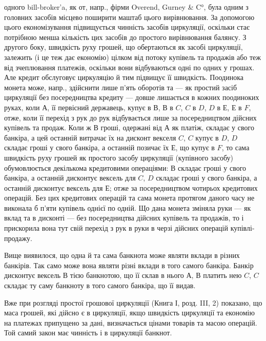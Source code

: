 \parcont{}  %
одного bill-broker’a, як от, напр., фірми Overend, Gurney \& C°, була одним з головних
засобів місцево поширити маштаб цього вирівнювання. За допомогою
цього економізування підвищується чинність засобів циркуляції, оскільки стає
потрібною менша кількість цих засобів до простого вирівнювання балянсу.
З другого боку, швидкість руху грошей, що обертаються як засобі циркуляції, залежить
(і це теж дає економію) цілком від потоку купівель та продажів або теж
від зчеплювання платежів, оскільки вони відбуваються одні по одних у грошах.
Але кредит обслуговує циркуляцію й тим підвищує її швидкість. Поодинока монета
може, напр., здійснити лише п’ять оборотів та — як простий засіб циркуляції
без посередництва кредиту — довше лишається в кожних поодиноких руках,
коли $А$, її первісний державець, купує в $В$, $В$ в $C$, $C$ в $D$, $D$ в $Е$, $Е$ в $F$, отже,
коли її перехід з рук до рук відбувається лише за посередництвом дійсних купівель
та продаж. Коли ж $В$ гроші, одержані від $А$ як платіж, складає у свого
банкіра, а цей останній витрачає їх на дисконт векселя $C$, $C$ купує в $D$, $D$ складає
гроші у свого банкіра, а останній позичає їх $Е$, що купує в $F$, то сама
швидкість руху грошей як простого засобу циркуляції (купівного засобу) обумовлюється декількома
кредитовими операціями: $В$ складає гроші у свого банкіра,
а останній дисконтує вексель для $C$, $D$ складає гроші у свого банкіра, а останній
дисконтує вексель для $Е$; отже за посередництвом чотирьох кредитових операцій.
Без цих кредитових операцій та сама монета протягом даного часу не виконала
б п’яти купівель однієї по одній. Що дана монета зміняла руки — як вклад та
в дисконті — без посередництва дійсних купівель та продажів, то і прискорила
вона тут свій перехід з рук в руки в черзі дійсних операцій купівлі-продажу.

Вище виявилося, що одна й та сама банкнота може являти вклади в
різних банкірів. Так само може вона являти різні вклади в того самого банкіра.
Банкір дисконтує вексель $В$ тією банкнотою, що її склав в нього $А$, $В$ платить
нею $C$, $C$ складає ту саму банкноту в того самого банкіра, що її видав.

Вже при розгляді простої грошової циркуляції (Книга І, розд. III, 2) показано,
що маса грошей, які дійсно є в циркуляції, якщо швидкість циркуляції
та економію на платежах припущено за дані, визначається цінами товарів та
масою операцій. Той самий закон має чинність і в циркуляції банкнот.

